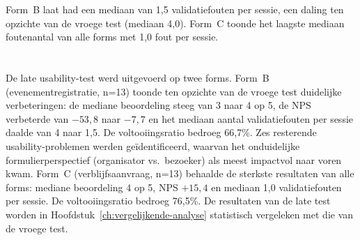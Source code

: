Form~B laat had een mediaan van 1,5 validatiefouten per sessie, een daling ten opzichte van de vroege test (mediaan 4,0). Form~C toonde het laagste mediaan foutenantal van alle forms met 1,0 fout per sessie.

\section{}

De late usability-test werd uitgevoerd op twee forms. Form~B (evenementregistratie, n=13) toonde ten opzichte van de vroege test duidelijke verbeteringen: de mediane beoordeling steeg van 3 naar 4 op 5, de NPS verbeterde van $-53{,}8$ naar $-7{,}7$ en het mediaan aantal validatiefouten per sessie daalde van 4 naar 1,5. De voltooiingsratio bedroeg 66,7\%. Zes resterende usability-problemen werden geïdentificeerd, waarvan het onduidelijke formulierperspectief (organisator vs.\ bezoeker) als meest impactvol naar voren kwam. Form~C (verblijfsaanvraag, n=13) behaalde de sterkste resultaten van alle forms: mediane beoordeling 4 op 5, NPS $+15{,}4$ en mediaan 1,0 validatiefouten per sessie. De voltooiingsratio bedroeg 76,5\%. De resultaten van de late test worden in Hoofdstuk~\ref{ch:vergelijkende-analyse} statistisch vergeleken met die van de vroege test.
